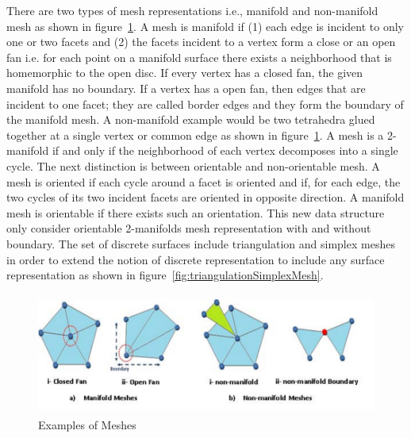 \documentclass{InsightArticle}
\begin{document}
There are two types of mesh representations i.e., manifold and non-manifold mesh as shown in figure~\ref{fig:meshes}. A mesh is manifold if (1) each edge is incident to only one or two facets and (2) the facets incident to a vertex form a close or an open fan i.e. for each point on a manifold surface there exists a neighborhood that is homemorphic to the open disc. If every vertex has a closed fan, the given manifold has no boundary. If a vertex has a open fan, then edges that are incident to one facet; they are called border edges and they form the boundary of the manifold mesh. A non-manifold example would be two tetrahedra glued together at a single vertex or common edge as shown in figure~\ref{fig:meshes}. A mesh is a 2-manifold if and only if the neighborhood of each vertex decomposes into a single cycle. The next distinction is between orientable and non-orientable mesh. A mesh is oriented if each cycle around a facet is oriented and if, for each edge, the two cycles of its two incident facets are oriented in opposite direction. A manifold mesh is orientable if there exists such an orientation. This new data structure only consider orientable 2-manifolds mesh representation with and without boundary. The set of discrete surfaces include triangulation and simplex meshes in order to extend the notion of discrete representation to include any surface representation as shown in figure~\ref{fig:triangulationSimplexMesh}.
\begin{figure}[!t]
	\centering
	\includegraphics[width=155mm, height=40mm]{Meshes}
	\caption{Examples of Meshes}
	\label{fig:meshes}
\end{figure}
\end{document}
